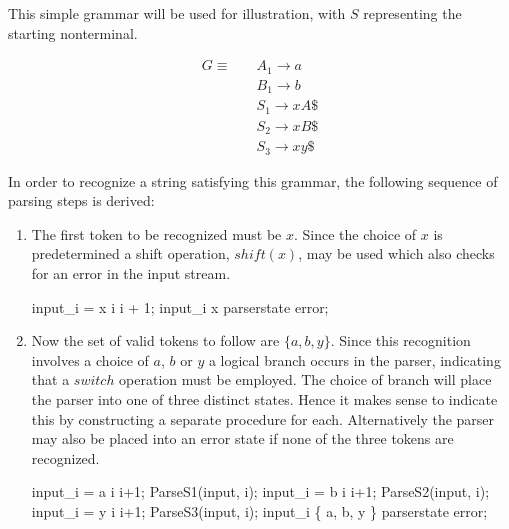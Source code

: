 \documentclass[envcountsame,runningheads]{llncs}
\begin{document}
This simple grammar will be used for illustration, with $S$ representing the starting nonterminal.

\begin{align*}
G \equiv \quad & A_1 \rightarrow a\\
               & B_1 \rightarrow b\\
               & S_1 \rightarrow x A \$\\
               & S_2 \rightarrow x B \$\\
               & S_3 \rightarrow x y \$
\end{align*}

In order to recognize a string satisfying this grammar, the following sequence of parsing steps is derived:
\begin{enumerate}
\item The first token to be recognized must be $x$. Since the choice of $x$ is predetermined a shift operation, $shift(x)$, may be used which also checks for an error in the input stream.
\begin{center}
\begin{gcl}
\IF input_i = x \rightarrow i \becomes i + 1;
\BAR input_i \neq x \rightarrow parserstate \becomes error;
\FI
\end{gcl}
\end{center}

\item Now the set of valid tokens to follow are $\{ a, b, y \}$. 
Since this recognition involves a choice of $a$, $b$ or $y$ a logical branch occurs in the parser, indicating that a $switch$ operation must be employed.
The choice of branch will place the parser into one of three distinct states.
Hence it makes sense to indicate this by constructing a separate procedure for each. 
Alternatively the parser may also be placed into an error state if none of the three tokens are recognized.
\begin{center}
\begin{gcl}
\IF input_i = a \rightarrow 
                \qquad i \becomes i+1; 
                \qquad ParseS1(input, i);
\BAR input_i = b \rightarrow 
                \qquad i \becomes i+1;
                \qquad ParseS2(input, i);
\BAR input_i = y \rightarrow 
                \qquad i \becomes i+1; 
                \qquad ParseS3(input, i);
\BAR input_i \notin \{ a, b, y \} \rightarrow 
                \qquad parserstate \becomes error;
\FI
\end{gcl}
\end{center}


\end{enumerate}
\end{document}

